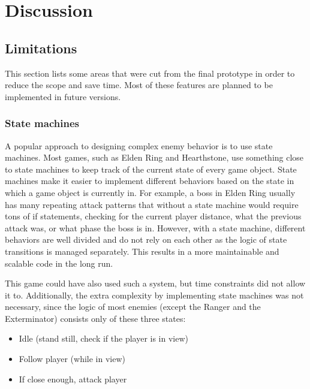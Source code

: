 \chapter{Discussion} \label{Chapter:Discussion}



\section{Limitations}

This section lists some areas that were cut from the final prototype in order to reduce the scope and save time. Most of these features are planned to be implemented in future versions.


\subsection{State machines}

A popular approach to designing complex enemy behavior is to use state machines. Most games, such as Elden Ring\cite{eldenRing2022} and Hearthstone\cite{hearthstone2014}, use something close to state machines to keep track of the current state of every game object. State machines make it easier to implement different behaviors based on the state in which a game object is currently in. For example, a boss in Elden Ring\cite{eldenRing2022} usually has many repeating attack patterns that without a state machine would require tons of if statements, checking for the current player distance, what the previous attack was, or what phase the boss is in. However, with a state machine, different behaviors are well divided and do not rely on each other as the logic of state transitions is managed separately. This results in a more maintainable and scalable code in the long run.

This game could have also used such a system, but time constraints did not allow it to. Additionally, the extra complexity by implementing state machines was not necessary, since the logic of most enemies (except the Ranger and the Exterminator) consists only of these three states:

\begin{itemize}
  \item Idle (stand still, check if the player is in view)
  \item Follow player (while in view)
  \item If close enough, attack player
\end{itemize}



